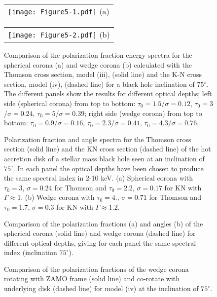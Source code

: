 \documentclass[manuscript]{aastex}
\begin{document}
\begin{figure}
\centering
  \begin{tabular}[b]{@{}p{}@{}}
    \centering\texttt{[image: Figure5-1.pdf]} 
    \centering\small (a)
  \end{tabular}%
  \quad
  \begin{tabular}[b]{@{}p{}@{}}
    \centering\texttt{[image: Figure5-2.pdf]} 
    \centering\small (b)
  \end{tabular}
  \caption{Comparison of the polarization fraction energy spectra for the spherical corona (a) and wedge corona (b) 
    calculated with the Thomson cross section, model (iii), (solid line) and the K-N cross section, model (iv), (dashed line) for a black hole  inclination of 75$^{\circ}$. 
    The different panels show the results for different optical depths; left side (spherical corona) from top to bottom: $\tau_0=1.5$/$\sigma=0.12$, $\tau_0=3$/$\sigma=0.24$, $\tau_0=5$/$\sigma=0.39$; right side (wedge corona) from top to bottom: $\tau_0=0.9$/$\sigma=0.16$, $\tau_0=2.3$/$\sigma=0.41$, $\tau_0=4.3$/$\sigma=0.76$.}
  \label{frackn}
\end{figure}

\begin{figure}
\caption{Polarization fraction and angle spectra for the Thomson cross section (solid line) and the KN cross section (dashed line) of the hot accretion disk of a stellar mass black hole seen
at an inclination of $75^{\circ}$. In each panel the optical depths have been chosen to produce the same spectral index in 2-10 keV. (a) Spherical corona with $\tau_0=3,\,\sigma=0.24$ for Thomson and $\tau_0=2.2,\,\sigma=0.17$ for KN with $\Gamma \approx 1$. (b) Wedge corona with $\tau_0=4.,\,\sigma=0.71$ for Thomson and $\tau_0=1.7,\,\sigma=0.3$ for KN with $\Gamma \approx 1.2$.}
\label{HE}
\end{figure}

\begin{figure}
\caption{Comparison of the polarization fractions (a) and angles (b) of the spherical corona
    (solid line) and wedge corona (dashed line) for different optical depths, giving for each panel the
    same spectral index (inclination $75^{\circ}$).}
    \label{both}
\end{figure}

\begin{figure}
\caption{Comparison of the polarization fractions of the wedge corona rotating with ZAMO frame (solid line) and co-rotate with underlying disk (dashed line) for model (iv) at the inclination of $75^{\circ}$.}
    \label{co-zamo}
\end{figure}
\end{document}
